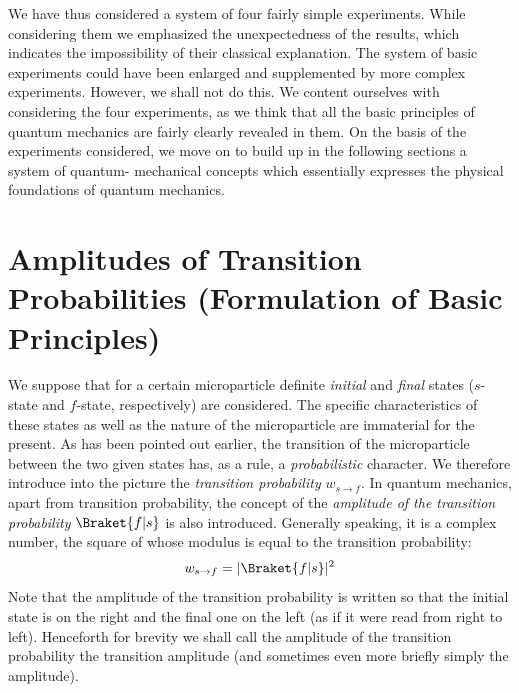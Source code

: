 \documentclass[a4paper,sfsidenotes,colorlinks=true]{tufte-book}
\numberwithin{equation}{section}
\numberwithin{figure}{section}
\begin{document}
We  have thus considered a system of four fairly simple experiments. While considering them we emphasized the unexpectedness of the results, which indicates the impossibility of their classical explanation. The system of basic experiments could have been enlarged and supplemented by more complex experiments. However, we shall not do this. We content ourselves with considering the four experiments, as we think that all the basic principles of quantum mechanics are fairly clearly revealed in them. On the basis of the experiments considered, we move on to build up in the following sections a system of quantum- mechanical concepts which essentially expresses the physical foundations of quantum mechanics.

\section{Amplitudes of Transition Probabilities (Formulation of Basic Principles)}
\label{sec-08}

We  suppose that for a certain microparticle definite
\emph{initial} and \emph{final} states ($s$-state and $f$-state,
respectively) are considered. The specific characteristics of these
states as well as the nature of the microparticle are immaterial for
the present. As has been pointed out earlier, the transition of the
microparticle between the two given states has, as a rule, a
\emph{probabilistic} character. We therefore introduce into the
picture the \emph{transition probability} $w_{s \to f}$. In quantum
mechanics, apart from transition probability, the concept of the
\emph{amplitude of the transition probability} $\Braket{f|s}$
\sidenote{The treatment of quantum mechanics on the basis of
  probability amplitudes is given in books by Feynman [3-5J and Dirac
  [9).} is also introduced. Generally speaking, it is a complex
number, the square of whose modulus is equal to the transition
probability:
\begin{equation}%
w_{s \to f} = |\Braket{f|s}|^{2}	
\label{eq-8.1}
\end{equation}
Note that the amplitude of the transition probability is written so that the initial state is on the right and the final one on the left (as if it were read from right to left). Henceforth for brevity we shall call the amplitude of the transition probability the transition amplitude (and sometimes even more briefly simply the amplitude).
\end{document}
